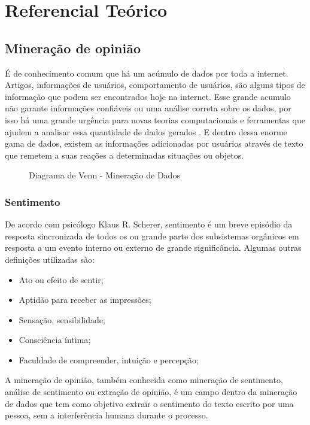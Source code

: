 \chapter{Referencial Teórico}\label{cap:referencial_teorico}

\section{Mineração de opinião}\label{sec:mineracao_dados}

É de conhecimento comum que há um acúmulo de dados por toda a internet. Artigos, informações de usuários, comportamento de usuários, são alguns tipos de informação que podem ser encontrados hoje na internet. Esse grande acumulo não garante informações confiáveis ou uma análise correta sobre os dados, por isso há uma grande urgência para novas teorias computacionais e ferramentas que ajudem a analisar essa quantidade de dados gerados \cite{fayyad1996data}. E dentro dessa enorme gama de dados, existem as informações adicionadas por usuários através de texto que remetem a suas reações a determinadas situações ou objetos.

\begin{figure}[H]
	\centering{}
	\caption{Diagrama de Venn - Mineração de Dados}
	\label{uni}
\end{figure}

\subsection{Sentimento}
De acordo com psicólogo Klaus R. Scherer, sentimento é um breve episódio da resposta sincronizada de todos os ou grande parte dos subsistemas orgânicos em resposta a um evento interno ou externo de grande significância\cite{scherer2001emotional}. Algumas outras definições utilizadas são:
\begin{itemize}
	\item Ato ou efeito de sentir;
	\item Aptidão para receber as impressões;
	\item Sensação, sensibilidade;
	\item Consciência íntima;
	\item Faculdade de compreender, intuição e percepção;
\end{itemize}

A mineração de opinião, também conhecida como mineração de sentimento, análise de sentimento ou extração de opinião, é um campo dentro da mineração de dados \cite{santos2014mineraccao} que tem como objetivo extrair o sentimento do texto escrito por uma pessoa, sem a interferência humana durante o processo.

